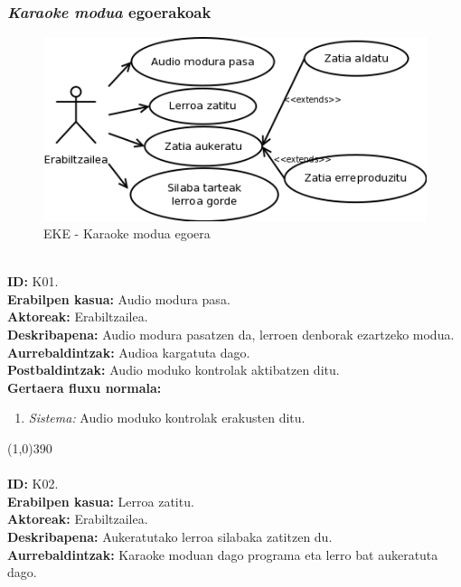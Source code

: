 \subsubsection{\textit{Karaoke modua} egoerakoak}
\begin{figure}[htp]
\begin{center}
\includegraphics[scale=0.6]{Pictures/Chapter4/Analisia/EKE-Karaoke.png}
\caption{EKE - Karaoke modua egoera}
\label{eke-karaoke}
\end{center}
\end{figure}
\noindent\\
\textbf{ID:} K01.\\
\textbf{Erabilpen kasua:} Audio modura pasa.\\
\textbf{Aktoreak:} Erabiltzailea.\\
\textbf{Deskribapena:} Audio modura pasatzen da, lerroen denborak ezartzeko modua.\\
\textbf{Aurrebaldintzak:} Audioa kargatuta dago.\\
\textbf{Postbaldintzak:} Audio moduko kontrolak aktibatzen ditu.\\
\textbf{Gertaera fluxu normala:}
\begin{enumerate}
	\item \textit{Sistema:} Audio moduko kontrolak erakusten ditu.
\end{enumerate}
\line(1,0){390}\\
\noindent\\
\textbf{ID:} K02.\\
\textbf{Erabilpen kasua:} Lerroa zatitu.\\
\textbf{Aktoreak:} Erabiltzailea.\\
\textbf{Deskribapena:} Aukeratutako lerroa silabaka zatitzen du.\\
\textbf{Aurrebaldintzak:} Karaoke moduan dago programa eta lerro bat aukeratuta dago.\\
